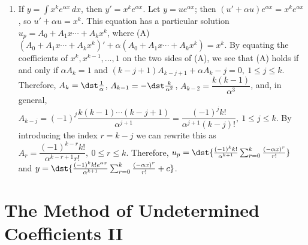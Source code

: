 \documentclass[openany]{book}
\newenvironment{sectionSolutions}{
 \begin{enumerate}[item-label={\thesection.\arabic{enumi}.}]
}{
 \end{enumerate}
}
\begin{document}
\begin{sectionSolutions}
\item
If $y=\int x^ke^{\alpha x}\,dx$, then $y'=x^ke^{\alpha x}$. Let
$y=ue^{\alpha x}$; then $(u'+\alpha u)e^{\alpha x}=x^ke^{\alpha x}$,
so $u'+\alpha u=x^k$. This equation has a
particular solution $u_p=A_0+A_1x\cdots+A_kx^k$, where (A)
$(A_0+A_1x\cdots+A_kx^k)'+\alpha(A_0+A_1x\cdots+A_kx^k)=
x^k$. By equating the coefficients of $x^k,
x^{k-1},\dots,1$  on the two sides of (A), we see that
(A) holds if and only if $\alpha A_k=1$ and
$(k-j+1)A_{k-j+1}+\alpha
A_k-j=0,\ 1\le j\le k$.  Therefore, $A_k=\dst\frac{1}{\alpha}$,
$A_{k-1}=-\dst\frac{k}{\alpha^2}$, $A_{k-2}=\dfrac{k(k-1)}{\alpha^3}$,
and, in general,
$A_{k-j}=(-1)^j\dfrac{k(k-1)\cdots(k-j+1)}{\alpha^{j+1}}=
\dfrac{(-1)^jk!}{\alpha^{j+1}(k-j)!},\
1\le
j\le k$. By introducing the index $r=k-j$ we can rewrite this as
$A_r=\dfrac{(-1)^{k-r}k!}{\alpha^{k-r+1}r!},\ 0\le r\le k$.
Therefore,
$u_p=\dst{\frac{(-1)^kk!}{ \alpha^{k+1}}\sum_{r=0}^k\frac{(-\alpha
x)^r}{ r!}}$ and
$y=\dst{\frac{(-1)^kk!e^{\alpha x}}{ \alpha^{k+1}}\sum_{r=0}^k\frac{(-\alpha
x)^r}{ r!}+c}$.
\end{sectionSolutions}

\section{The Method of Undetermined Coefficients II}
\end{document}
